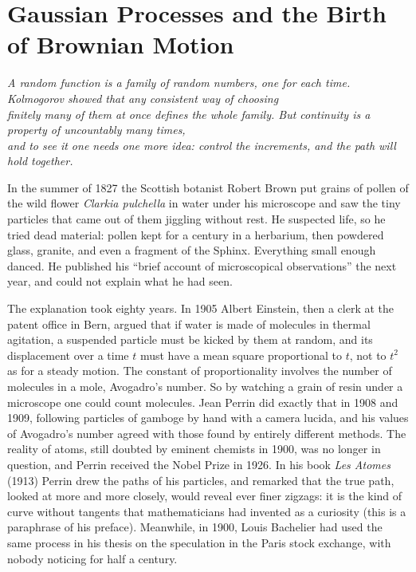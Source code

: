 \chapter{Gaussian Processes and the Birth of Brownian Motion}

\begin{center}\itshape
A random function is a family of random numbers, one for each time. Kolmogorov showed that any consistent way of choosing\\
finitely many of them at once defines the whole family. But continuity is a property of uncountably many times,\\
and to see it one needs one more idea: control the increments, and the path will hold together.
\end{center}

In the summer of 1827 the Scottish botanist Robert Brown put grains of pollen of the wild flower \emph{Clarkia pulchella} in water under his microscope and saw
the tiny particles that came out of them jiggling without rest. He suspected life, so he tried dead material: pollen kept for a century in a herbarium, then
powdered glass, granite, and even a fragment of the Sphinx. Everything small enough danced. He published his ``brief account of microscopical observations'' the next year,
and could not explain what he had seen.

The explanation took eighty years. In 1905 Albert Einstein, then a clerk at the patent office in Bern, argued that if water is made of molecules in thermal agitation,
a suspended particle must be kicked by them at random, and its displacement over a time $t$ must have a mean square proportional to $t$, not to $t^2$ as for
a steady motion. The constant of proportionality involves the number of molecules in a mole, Avogadro's number. So by watching a grain of resin under a
microscope one could count molecules. Jean Perrin did exactly that in 1908 and 1909, following particles of gamboge by hand with a camera lucida, and his
values of Avogadro's number agreed with those found by entirely different methods. The reality of atoms, still doubted by eminent chemists in 1900, was no longer
in question, and Perrin received the Nobel Prize in 1926. In his book \emph{Les Atomes} (1913) Perrin drew the paths of his particles, and remarked that the true
path, looked at more and more closely, would reveal ever finer zigzags: it is the kind of curve without tangents that mathematicians had invented as a curiosity
(this is a paraphrase of his preface). Meanwhile, in 1900, Louis Bachelier had used the same process in his thesis on the speculation in the Paris stock
exchange, with nobody noticing for half a century.

